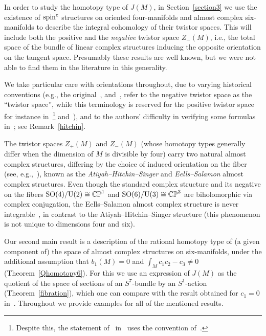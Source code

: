 \documentclass[pdftex]{sigma}%
\newcommand{\CP}{\mathbb{CP}}
\numberwithin{equation}{section}
\begin{document}
In order to study the homotopy type of $J(M)$, in Section~\ref{section3} we use the existence of ${\rm spin}^{\rm c}$ structures on oriented four-manifolds and almost complex six-manifolds to describe the integral cohomology of their twistor spaces. This will include both the positive and the \emph{negative} twistor space $Z_-(M)$, i.e., the total space of the bundle of linear complex structures inducing the opposite orientation on the tangent space. Presumably these results are well known, but we were not able to find them in the literature in this generality.

We take particular care with orientations throughout, due to varying historical conventions (e.g., the original~\cite{AHS78}, and~\cite{Hi81}, refer to the negative twistor space as the ``twistor space'', while this terminology is reserved for the positive twistor space for instance in~\cite{LM}\footnote{Despite this, the statement of~\cite[Theorem~4.1]{AHS78} in~\cite[Theorem~IV.9.14]{LM} uses the convention of~\cite{AHS78}.} and~\cite{Sa84}), and to the authors' difficulty in verifying some formulas in~\cite[p.~135]{Hi81}; see Remark~\ref{hitchin}.

The twistor spaces $Z_+(M)$ and $Z_-(M)$ (whose homotopy types generally differ when the dimension of $M$ is divisible by four) carry two natural almost complex structures, differing by the choice of induced orientation on the fiber (see, e.g.,~\cite[Proposition~3.1]{Sa84}), known as the \emph{Atiyah--Hitchin--Singer} and \emph{Eells--Salamon} almost complex structures. Even though the standard complex structure and its negative on the fibers ${\rm SO}(4)/{\rm U}(2) \cong \CP^1$ and ${{\rm SO}(6)/{\rm U}(3) \cong \CP^3}$ are biholomorphic via complex conjugation, the Eells--Salamon almost complex structure is never integrable~\cite[Proposition~3.4]{Sa84}, in contrast to the Atiyah--Hitchin--Singer structure (this phenomenon is not unique to dimensions four and six).

Our second main result is a description of the rational homotopy type of (a given component of) the space of almost complex structures on six-manifolds, under the additional assumption that $b_1(M) = 0$ and $\int_M c_1c_2 - c_3 \neq 0$ (Theorem~\ref{Qhomotopy6}). For this we use an expression of $J(M)$ as the quotient of the space of sections of an $S^7$-bundle by an $S^1$-action (Theorem~\ref{fibration}), which one can compare with the result obtained for $c_1=0$ in~\cite[Proposition~5.1]{FGM21}.
Throughout we provide examples for all of the mentioned results.
\end{document}
